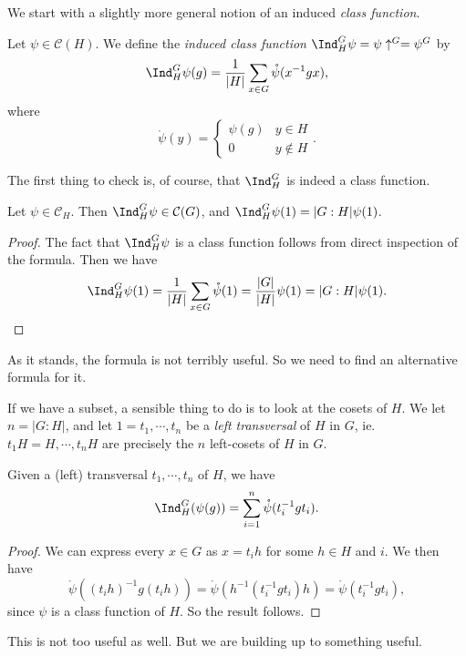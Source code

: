 \documentclass[a4paper]{article}
\begin{document}
We start with a slightly more general notion of an induced \emph{class function}.
\begin{defi}
  Let $\psi \in \mathcal{C}(H)$. We define the \emph{induced class function} $\Ind^G_H \psi = \psi\uparrow^G = \psi^G$ by
  \[
    \Ind_H^G \psi(g) = \frac{1}{|H|} \sum_{x \in G} \mathring{\psi} (x^{-1}gx),
  \]
  where
  \[
    \mathring{\psi}(y) = 
    \begin{cases}
      \psi(g) & y \in H\\
      0 & y \not\in H
    \end{cases}.
  \]
\end{defi}
The first thing to check is, of course, that $\Ind^G_H$ is indeed a class function.

\begin{lemma}
  Let $\psi \in \mathcal{C}_H$. Then $\Ind_H^G \psi \in \mathcal{C}(G)$, and $\Ind_H^G\psi(1) = |G:H| \psi(1)$.
\end{lemma}

\begin{proof}
  The fact that $\Ind_H^G\psi$ is a class function follows from direct inspection of the formula. Then we have
  \[
    \Ind_H^G \psi(1) = \frac{1}{|H|} \sum_{x \in G} \mathring{\psi}(1) = \frac{|G|}{|H|}\psi(1) = |G:H|\psi(1).
  \]
\end{proof}
As it stands, the formula is not terribly useful. So we need to find an alternative formula for it.

If we have a subset, a sensible thing to do is to look at the cosets of $H$. We let $n = |G:H|$, and let $1 = t_1, \cdots, t_n$ be a \emph{left transversal} of $H$ in $G$, ie. $t_1 H = H, \cdots, t_n H$ are precisely the $n$ left-cosets of $H$ in $G$.

\begin{lemma}
  Given a (left) transversal $t_1, \cdots, t_n$ of $H$, we have
  \[
    \Ind_H^G(\psi(g)) = \sum_{i = 1}^n \mathring{\psi}(t_i^{-1} g t_i).
  \]
\end{lemma}

\begin{proof}
  We can express every $x \in G$ as $x = t_i h$ for some $h \in H$ and $i$. We then have
  \[
    \mathring{\psi}((t_i h)^{-1} g(t_i h)) = \mathring{\psi}(h^{-1} (t_i^{-1} g t_i) h) = \mathring{\psi}(t_i^{-1} gt_i),
  \]
  since $\psi$ is a class function of $H$. So the result follows.
\end{proof}

This is not too useful as well. But we are building up to something useful.
\end{document}
